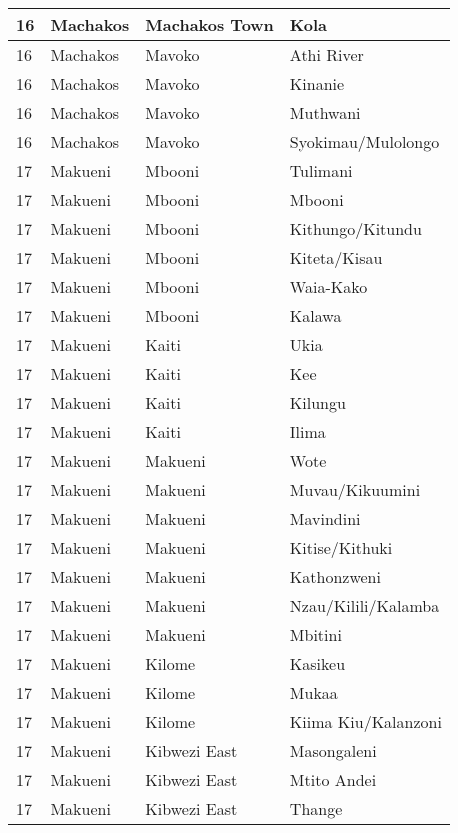 \begin{table}[!ht]
\begin{tabular}{|l|l|l|l|}
        16 & Machakos & Machakos Town & Kola \\ \hline
        16 & Machakos & Mavoko & Athi River \\ \hline
        16 & Machakos & Mavoko & Kinanie \\ \hline
        16 & Machakos & Mavoko & Muthwani \\ \hline
        16 & Machakos & Mavoko & Syokimau/Mulolongo \\ \hline
        17 & Makueni & Mbooni & Tulimani \\ \hline
        17 & Makueni & Mbooni & Mbooni \\ \hline
        17 & Makueni & Mbooni & Kithungo/Kitundu \\ \hline
        17 & Makueni & Mbooni & Kiteta/Kisau \\ \hline
        17 & Makueni & Mbooni & Waia-Kako \\ \hline
        17 & Makueni & Mbooni & Kalawa \\ \hline
        17 & Makueni & Kaiti & Ukia \\ \hline
        17 & Makueni & Kaiti & Kee \\ \hline
        17 & Makueni & Kaiti & Kilungu \\ \hline
        17 & Makueni & Kaiti & Ilima \\ \hline
        17 & Makueni & Makueni & Wote \\ \hline
        17 & Makueni & Makueni & Muvau/Kikuumini \\ \hline
        17 & Makueni & Makueni & Mavindini \\ \hline
        17 & Makueni & Makueni & Kitise/Kithuki \\ \hline
        17 & Makueni & Makueni & Kathonzweni \\ \hline
        17 & Makueni & Makueni & Nzau/Kilili/Kalamba \\ \hline
        17 & Makueni & Makueni & Mbitini \\ \hline
        17 & Makueni & Kilome & Kasikeu \\ \hline
        17 & Makueni & Kilome & Mukaa \\ \hline
        17 & Makueni & Kilome & Kiima Kiu/Kalanzoni \\ \hline
        17 & Makueni & Kibwezi East & Masongaleni \\ \hline
        17 & Makueni & Kibwezi East & Mtito Andei \\ \hline
        17 & Makueni & Kibwezi East & Thange \\ \hline

\end{tabular}
\end{table}
